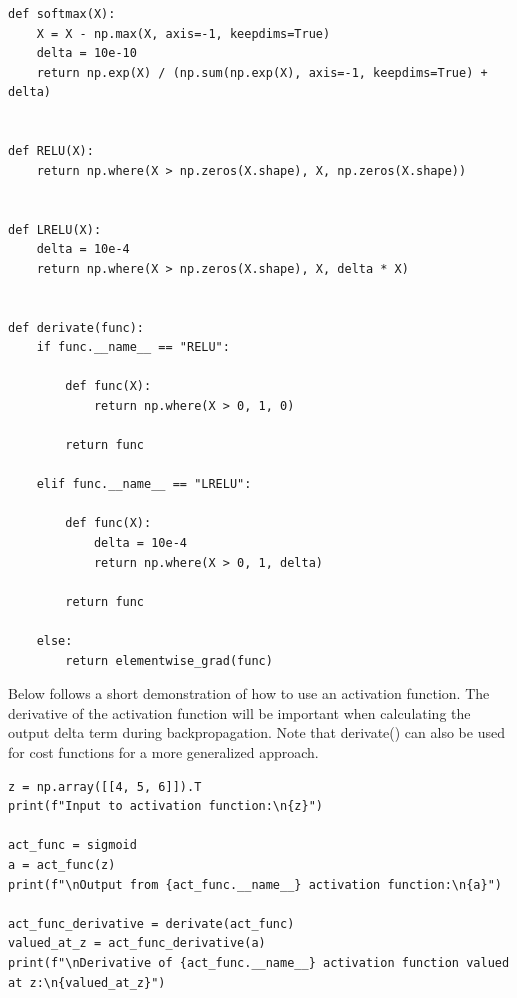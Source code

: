 \documentclass{beamer}
\begin{document}
\begin{frame}
\begin{verbatim}
def softmax(X):
    X = X - np.max(X, axis=-1, keepdims=True)
    delta = 10e-10
    return np.exp(X) / (np.sum(np.exp(X), axis=-1, keepdims=True) + delta)


def RELU(X):
    return np.where(X > np.zeros(X.shape), X, np.zeros(X.shape))


def LRELU(X):
    delta = 10e-4
    return np.where(X > np.zeros(X.shape), X, delta * X)


def derivate(func):
    if func.__name__ == "RELU":

        def func(X):
            return np.where(X > 0, 1, 0)

        return func

    elif func.__name__ == "LRELU":

        def func(X):
            delta = 10e-4
            return np.where(X > 0, 1, delta)

        return func

    else:
        return elementwise_grad(func)

\end{verbatim}


Below follows a short demonstration of how to use an activation
function. The derivative of the activation function will be important
when calculating the output delta term during backpropagation. Note
that derivate() can also be used for cost functions for a more
generalized approach.












\begin{verbatim}
z = np.array([[4, 5, 6]]).T
print(f"Input to activation function:\n{z}")

act_func = sigmoid
a = act_func(z)
print(f"\nOutput from {act_func.__name__} activation function:\n{a}")

act_func_derivative = derivate(act_func)
valued_at_z = act_func_derivative(a)
print(f"\nDerivative of {act_func.__name__} activation function valued at z:\n{valued_at_z}")

\end{verbatim}
\end{frame}
\end{document}
